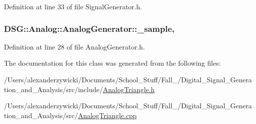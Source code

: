 Definition at line 33 of file Signal\-Generator.\-h.

\hypertarget{classDSG_1_1Analog_1_1AnalogGenerator_af20b26cee2cd03dfdb3d845f527b2f1c}{
\subsubsection[{\-\_\-sample}]{ D\-S\-G\-::\-Analog\-::\-Analog\-Generator\-::\-\_\-sample\hspace{0.3cm}{\ttfamily [protected]}, {\ttfamily [inherited]}}}\label{classDSG_1_1Analog_1_1AnalogGenerator_af20b26cee2cd03dfdb3d845f527b2f1c}


Definition at line 28 of file Analog\-Generator.\-h.



The documentation for this class was generated from the following files\-:\begin{DoxyCompactItemize}
\item 
/\-Users/alexanderzywicki/\-Documents/\-School\-\_\-\-Stuff/\-Fall\-\_/\-Digital\-\_\-\-Signal\-\_\-\-Generation\-\_\-and\-\_\-\-Analysis/src/include/\hyperlink{AnalogTriangle_8h}{Analog\-Triangle.\-h}\item 
/\-Users/alexanderzywicki/\-Documents/\-School\-\_\-\-Stuff/\-Fall\-\_/\-Digital\-\_\-\-Signal\-\_\-\-Generation\-\_\-and\-\_\-\-Analysis/src/\hyperlink{AnalogTriangle_8cpp}{Analog\-Triangle.\-cpp}\end{DoxyCompactItemize}
